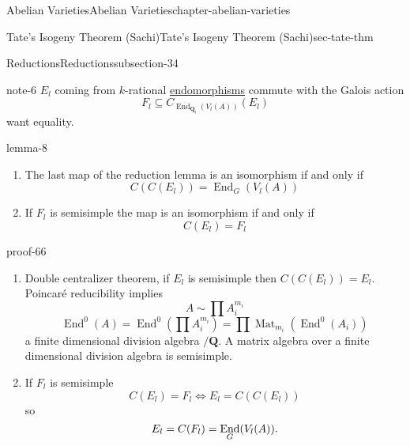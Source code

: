 \documentclass[oneside,10pt,]{book}
\renewcommand{\qedhere}{\relax}
\numberwithin{equation}{section}
\newcommand{\QQ}{\mathbf{Q}}
\DeclareMathOperator{\End}{End}
\DeclareMathOperator{\Mat}{Mat}
\begin{document}
\begin{chapterptx}{Abelian Varieties}{}{Abelian Varieties}{}{}{chapter-abelian-varieties}
\begin{sectionptx}{Tate's Isogeny Theorem (Sachi)}{}{Tate's Isogeny Theorem (Sachi)}{}{}{sec-tate-thm}
\begin{subsectionptx}{Reductions}{}{Reductions}{}{}{subsection-34}
\begin{note}{}{note-6}%
\hypertarget{p-388}{}%
\(E_l\) coming from \(k\)-rational \hyperref[def-supersing-isog-endo]{endomorphisms} commute with the Galois action%
\begin{equation*}
F_l\subseteq C_{\End_{\QQ_l}(V_l(A))}(E_l)
\end{equation*}
want equality.%
\end{note}
\begin{lemma}{}{}{lemma-8}%
\hypertarget{p-389}{}%
\leavevmode%
\begin{enumerate}
\item\hypertarget{li-77}{}The last map of the reduction lemma is an isomorphism if and only if%
\begin{equation*}
C(C(E_l)) = \End_G(V_l(A))
\end{equation*}
%
\item\hypertarget{li-78}{}If \(F_l\) is semisimple the map is an isomorphism if and only if%
\begin{equation*}
C(E_l) = F_l
\end{equation*}
%
\end{enumerate}
%
\end{lemma}
\begin{proofptx}{}{proof-66}
\hypertarget{p-390}{}%
\leavevmode%
\begin{enumerate}
\item\hypertarget{li-79}{}Double centralizer theorem, if \(E_l\) is semisimple then \(C(C(E_l))= E_l\). Poincaré reducibility implies%
\begin{equation*}
A\sim \prod A_i^{m_i}
\end{equation*}
%
\begin{equation*}
\End^0(A) = \End^0(\prod A_i^{m_i}) = \prod \Mat_{m_i}(\End^0(A_i))
\end{equation*}
a finite dimensional division algebra \(/\QQ\). A matrix algebra over a finite dimensional division algebra is semisimple.%
\item\hypertarget{li-80}{}If \(F_l\) is semisimple%
\begin{equation*}
C(E_l) = F_l \iff E_l = C(C(E_l))
\end{equation*}
so%
\begin{equation*}
E_l = C(F_l) = \End_G(V_l(A))\text{.}\qedhere
\end{equation*}
%
\end{enumerate}
%
\end{proofptx}
\end{subsectionptx}

\end{sectionptx}
\end{chapterptx}
\end{document}

